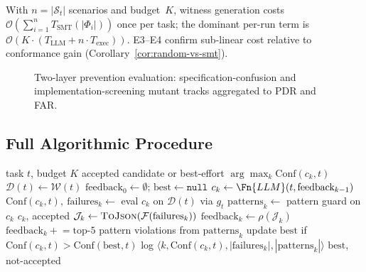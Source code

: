 With $n=|\mathcal{S}_t|$ scenarios and budget~$K$, witness generation costs
$\mathcal{O}(\sum_{i=1}^{n} T_{\text{SMT}}(|\Phi_i|))$ once per task; the
dominant per-run term is
$\mathcal{O}(K \cdot (T_{\text{LLM}} + n \cdot T_{\text{exec}}))$.
E3--E4 confirm sub-linear cost relative to conformance gain
(Corollary~\ref{cor:random-vs-smt}).

\begin{figure}[t]
  \centering
  \caption{Two-layer prevention evaluation: specification-confusion and
    implementation-screening mutant tracks aggregated to PDR and FAR.}
  \label{fig:prevention-protocol}
\end{figure}

\subsection{Full Algorithmic Procedure}
\label{sec:method:algorithm}

\begin{algorithm}[t]
\caption{HSP-Agile (\textsc{SgDP} instantiation)}
\label{alg:sgdp}
\begin{algorithmic}[1]
\Require task $t$, budget $K$
\Ensure accepted candidate or best-effort $\arg\max_k \mathrm{Conf}(c_k,t)$
\State $\mathcal{D}(t) \leftarrow \mathcal{W}(t)$
\State $\text{feedback}_0 \leftarrow \emptyset$; $\text{best} \leftarrow \mathtt{null}$
  \State $c_k \leftarrow \Fn{LLM}(t, \text{feedback}_{k-1})$
  \State $\mathrm{Conf}(c_k,t),\ \text{failures}_k \leftarrow$ eval $c_k$ on $\mathcal{D}(t)$ via $g_t$
  \State $\text{patterns}_k \leftarrow$ pattern guard on $c_k$
   \Return $c_k$, accepted \EndIf
  \State $\mathcal{J}_k \leftarrow \textsc{ToJson}(\mathcal{F}(\text{failures}_k))$
  \State $\text{feedback}_k \leftarrow \rho(\mathcal{J}_k)$
  \State $\text{feedback}_k \mathrel{+}= \text{top-}5$ pattern violations from $\text{patterns}_k$
  \State update $\text{best}$ if $\mathrm{Conf}(c_k,t) > \mathrm{Conf}(\text{best},t)$
  \State log $\langle k, \mathrm{Conf}(c_k,t), |\text{failures}_k|, |\text{patterns}_k|\rangle$
\EndFor
\Return $\text{best}$, not-accepted
\end{algorithmic}
\end{algorithm}

